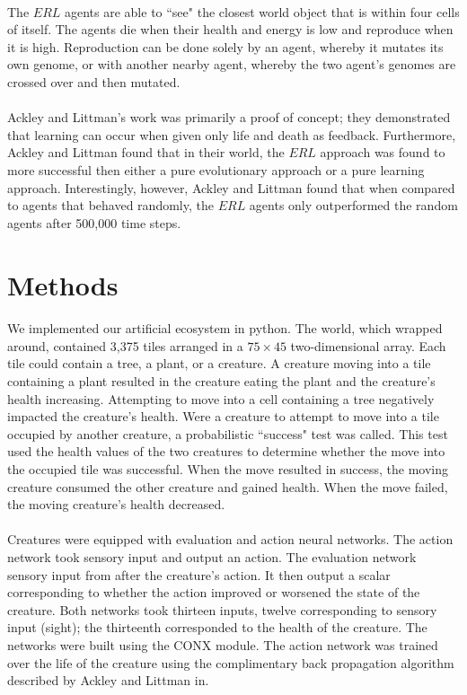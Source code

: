 \documentclass[12pt]{report}
\begin{document}
\paragraph{} The $ERL$ agents are able to ``see" the closest world object that is within four cells of itself. The agents die when their health and energy is low and reproduce when it is high. Reproduction can be done solely by an agent, whereby it mutates its own genome, or with another nearby agent, whereby the two agent's genomes are crossed over and then mutated.
\paragraph{} Ackley and Littman's work was primarily a proof of concept; they demonstrated that learning can occur when given only life and death as feedback. Furthermore, Ackley and Littman found that in their world, the $ERL$ approach was found to more successful then either a pure evolutionary approach or a pure learning approach. Interestingly, however, Ackley and Littman  found that when compared to agents that behaved randomly, the $ERL$ agents only outperformed the random agents after 500,000 time steps. 

\section*{Methods}
\paragraph{} We implemented our artificial ecosystem in python. The world, which wrapped around, contained 3,375 tiles arranged in a $75 \times 45$ two-dimensional array. Each tile could contain a tree, a plant, or a creature. A creature moving into a tile containing a plant resulted in the creature eating the plant and the creature's health increasing. Attempting to move into a cell containing a tree negatively impacted the creature's health. Were a creature to attempt to move into a tile occupied by another creature, a probabilistic ``success" test was called. This test used the health values of the two creatures to determine whether the move into the occupied tile was successful. When the move resulted in success, the moving creature consumed the other creature and gained health. When the move failed, the moving creature's health decreased.
\paragraph{}  Creatures were equipped with evaluation and action neural networks. The action network took sensory input and output an action. The evaluation network sensory input from after the creature's action. It then output a scalar corresponding to whether the action improved or worsened the state of the creature. Both networks took thirteen inputs, twelve corresponding to sensory input (sight); the thirteenth corresponded to the health of the creature. The networks were built using the CONX module. The action network was trained over the life of the creature using the complimentary back propagation algorithm described by Ackley and Littman in. 
\end{document}
